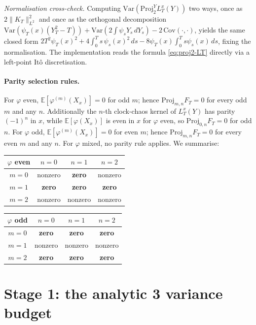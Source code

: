 \documentclass[11pt,reqno]{amsart}
\theoremstyle{plain}
\theoremstyle{definition}
\theoremstyle{remark}
\newcommand{\E}{\mathbb{E}}
\newcommand{\Var}{\mathrm{Var}}
\newcommand{\Cov}{\mathrm{Cov}}
\newcommand{\Proj}{\mathrm{Proj}}
\newcommand{\Loc}{L}
\begin{document}
\noindent\emph{Normalisation cross-check.} Computing
$\Var(\Proj^Y_2 \Loc_T^x(Y))$ two ways, once as $2 \|K_T\|_{L^2}^2$
and once as the orthogonal decomposition
$\Var(\psi_T(x)(Y_T^2 - T)) + \Var(2 \int \psi_s Y_s\,dY_s)
- 2\,\Cov(\cdot, \cdot)$, yields the same closed form
$2 T^2 \psi_T(x)^2 + 4 \int_0^T s\,\psi_s(x)^2\,ds
- 8 \psi_T(x) \int_0^T s \psi_s(x)\,ds$, fixing the normalisation.
The implementation reads the formula \eqref{eq:proj2-LT} directly via
a left-point It\^o discretisation.

\paragraph{Parity selection rules.}
For $\varphi$ even, $\E[\varphi^{(m)}(X_x)] = 0$ for odd $m$; hence
$\Proj_{m, n} F_T = 0$ for every odd $m$ and any $n$. Additionally
the $n$-th clock-chaos kernel of $\Loc_T^x(Y)$ has parity
$(-1)^n$ in $x$, while $\E[\varphi(X_x)]$ is even in $x$ for
$\varphi$ even, so $\Proj_{0, n} F_T = 0$ for odd $n$. For $\varphi$
odd, $\E[\varphi^{(m)}(X_x)] = 0$ for even $m$; hence
$\Proj_{m, n} F_T = 0$ for every even $m$ and any $n$. For $\varphi$
mixed, no parity rule applies. We summarise:

\begin{center}
\small
\begin{tabular}{c|ccc}
$\varphi$ even & $n=0$ & $n=1$ & $n=2$ \\\hline
$m=0$ & nonzero & \textbf{zero} & nonzero \\
$m=1$ & \textbf{zero} & \textbf{zero} & \textbf{zero} \\
$m=2$ & nonzero & nonzero & nonzero \\
\end{tabular}
\hspace{0.7cm}
\begin{tabular}{c|ccc}
$\varphi$ odd & $n=0$ & $n=1$ & $n=2$ \\\hline
$m=0$ & \textbf{zero} & \textbf{zero} & \textbf{zero} \\
$m=1$ & nonzero & nonzero & nonzero \\
$m=2$ & \textbf{zero} & \textbf{zero} & \textbf{zero} \\
\end{tabular}
\end{center}

\section{Stage 1: the analytic 3 variance budget}
\label{sec:stage1}
\end{document}
